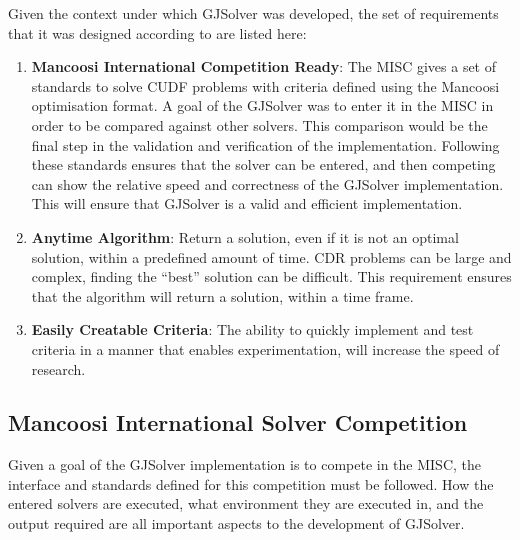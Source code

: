 Given the context under which GJSolver was developed, the set of requirements that it was designed according to are listed here:
\begin{enumerate}
  \item \textbf{Mancoosi International Competition Ready}: The MISC gives a set of standards to solve CUDF problems with criteria defined using the Mancoosi optimisation format.
  A goal of the GJSolver was to enter it in the MISC in order to be compared against other solvers.
  This comparison would be the final step in the validation and verification of the implementation.
  Following these standards ensures that the solver can be entered, and then competing can show the relative speed and correctness of the GJSolver implementation.
  This will ensure that GJSolver is a valid and efficient implementation. 
  \item \textbf{Anytime Algorithm}: Return a solution, even if it is not an optimal solution, within a predefined amount of time. 
  CDR problems can be large and complex, finding the ``best'' solution can be difficult. 
  This requirement ensures that the algorithm will return a solution, within a time frame.
  \item \textbf{Easily Creatable Criteria}: The ability to quickly implement and test criteria in a manner that enables experimentation, will increase the speed of research.
\end{enumerate}

\subsection{Mancoosi International Solver Competition}
\label{impl.MISCDEF}
Given a goal of the GJSolver implementation is to compete in the MISC, the interface and standards defined for this competition must be followed.
How the entered solvers are executed, what environment they are executed in, and the output required are all important aspects to the development of GJSolver.

